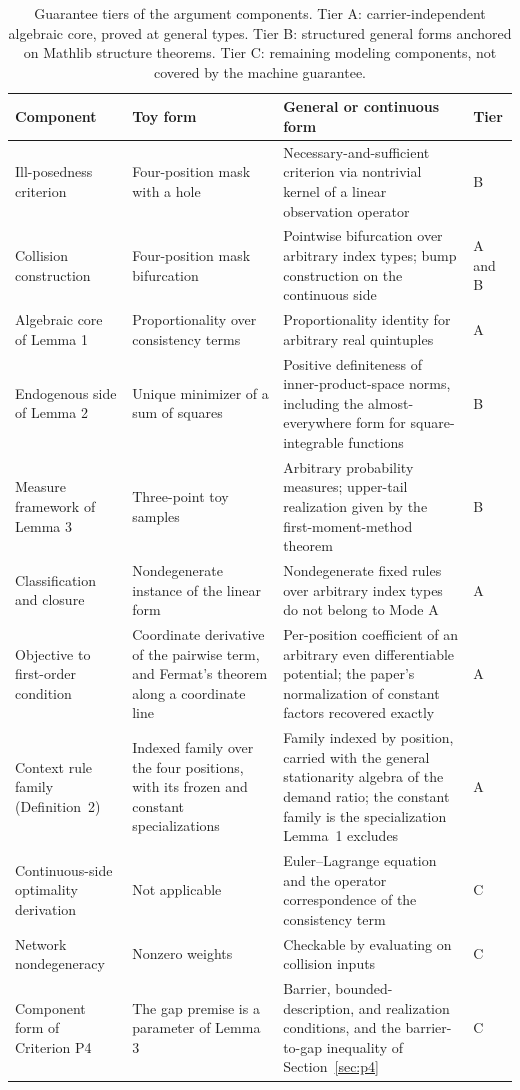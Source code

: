 \begin{table}[t]
\caption{Guarantee tiers of the argument components. Tier A: carrier-independent algebraic core, proved at general types. Tier B: structured general forms anchored on Mathlib structure theorems. Tier C: remaining modeling components, not covered by the machine guarantee.}
\label{tab:layers}
\centering
\small
\begin{tabular}{@{}>{\raggedright\arraybackslash}p{}>{\raggedright\arraybackslash}p{}>{\raggedright\arraybackslash}p{}>{\centering\arraybackslash}p{}@{}}
\hline
\textbf{Component} & \textbf{Toy form} & \textbf{General or continuous form} & \textbf{Tier}\\
\hline
Ill-posedness criterion & Four-position mask with a hole & Necessary-and-sufficient criterion via nontrivial kernel of a linear observation operator & B\\
\hline
Collision construction & Four-position mask bifurcation & Pointwise bifurcation over arbitrary index types; bump construction on the continuous side & A and B\\
\hline
Algebraic core of Lemma 1 & Proportionality over consistency terms & Proportionality identity for arbitrary real quintuples & A\\
\hline
Endogenous side of Lemma 2 & Unique minimizer of a sum of squares & Positive definiteness of inner-product-space norms, including the almost-everywhere form for square-integrable functions & B\\
\hline
Measure framework of Lemma 3 & Three-point toy samples & Arbitrary probability measures; upper-tail realization given by the first-moment-method theorem & B\\
\hline
Classification and closure & Nondegenerate instance of the linear form & Nondegenerate fixed rules over arbitrary index types do not belong to Mode A & A\\
\hline
Objective to first-order condition & Coordinate derivative of the pairwise term, and Fermat's theorem along a coordinate line & Per-position coefficient of an arbitrary even differentiable potential; the paper's normalization of constant factors recovered exactly & A\\
\hline
Context rule family (Definition~2) & Indexed family over the four positions, with its frozen and constant specializations & Family indexed by position, carried with the general stationarity algebra of the demand ratio; the constant family is the specialization Lemma~1 excludes & A\\
\hline
Continuous-side optimality derivation & Not applicable & Euler--Lagrange equation and the operator correspondence of the consistency term & C\\
\hline
Network nondegeneracy & Nonzero weights & Checkable by evaluating on collision inputs & C\\
\hline
Component form of Criterion P4 & The gap premise is a parameter of Lemma 3 & Barrier, bounded-description, and realization conditions, and the barrier-to-gap inequality of Section~\ref{sec:p4} & C\\
\hline
\end{tabular}
\end{table}

